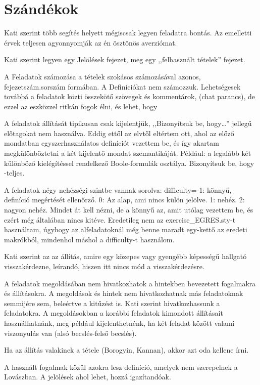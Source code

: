 \chapter{Szándékok}

Kati szerint több segítés helyett mégiscsak legyen feladatra bontás. Az emelletti érvek teljesen agyonnyomják az én ösztönös averziómat.

Kati szerint legyen egy Jelölések fejezet, meg egy ,,felhasznált tételek'' fejezet.

A Feladatok számozása a tételek szokásos számozásával azonos, fejezetszám.sorszám formában. A Definíciókat nem számozzuk. Lehetségesek továbbá a feladatok közti összekötő szövegek és kommentárok, (chat parancs), de ezzel az eszközzel ritkán fogok élni, és lehet, hogy

A feladatok állítását tipikusan csak kijelentjük, ,,Bizonyítsuk be, hogy\dots'' jellegű előtagokat nem használva. Eddig ettől az elvtől eltértem ott, ahol az előző mondatban egyszerhasználatos definíciót vezettem be, és így akartam megkülönböztetni a két kijelentő mondat szemantikáját. Például:  a legalább két különböző kielégítéssel rendelkező Boole-formulák
osztálya. Bizonyítsuk be, hogy  \NP-teljes.

A feladatok négy nehézségi szintbe vannak sorolva: difficulty=-1: könnyű, definíció megértését ellenőrző. 0: Az alap, ami nincs külön jelölve. 1: nehéz. 2: nagyon nehéz. Mindet át kell nézni, de a könnyű az, amit utólag vezettem be, és ezért még általában nincs kitéve. Eredetileg nem az exercise\_EGRES.sty-t használtam, úgyhogy az alfeladatoknál még benne maradt egy-kettő az eredeti \hard makrókból, mindenhol máshol a difficulty-t használom.

Kati szerint az az állítás, amire egy közepes vagy gyengébb képességű hallgató visszakérdezne, leírandó, hiszen itt nincs mód a visszakérdezésre.

A feladatok megoldásában nem hivatkozhatok a hintekben bevezetett fogalmakra és állításokra. A megoldások és hintek nem hivatkozhatnak más feladatoknak semmijére sem, beleértve a kitűzést is. Kati szerint hivatkozhassunk a feladatokra. A megoldásokban a korábbi feladatok kimondott állításait használhatnánk, meg például kijelenthetnénk, ha két feladat között valami viszonyulás van (alsó becslés-felső becslés).

Ha az állítás valakinek a tétele (Borogyin, Kannan), akkor azt oda kellene írni.

A használt fogalmak közül azokra lesz definíció, amelyek nem szerepelnek a Lovászban. A jelölések ahol lehet, hozzá igazítandóak.

